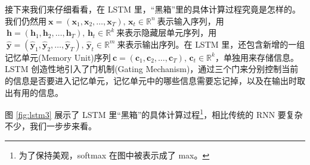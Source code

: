 \documentclass[12pt,a4paper]{article}
\begin{document}
接下来我们来仔细看看，在 {\crimson LSTM} 里，“黑箱”里的具体计算过程究竟是怎样的。我们仍然用$\:\bm{\mathbf{x}}=(\bm{x}_1,\bm{x}_2,\ldots,\bm{x}_T),\, \bm{x}_t \in \mathbb{R}^n\:$表示输入序列，用$\:\bm{\mathbf{h}}=(\bm{h}_1,\bm{h}_2,\ldots,\bm{h}_T),\, \bm{h}_t \in \mathbb{R}^k\:$来表示隐藏层单元序列，用$\:\hat{\bm{\mathbf{y}}}=(\hat{\bm{y}}_1,\hat{\bm{y}}_2,\ldots,\hat{\bm{y}}_T),\, \hat{\bm{y}}_t \in \mathbb{R}^m\:$来表示输出序列。在 {\crimson LSTM} 里，还包含新增的一组{\hei 记忆单元}({\crimson Memory Unit})序列$\:\bm{\mathbf{c}}=(\bm{c}_1,\bm{c}_2,\ldots,\bm{c}_T),\, \bm{c}_t \in \mathbb{R}^k$，单独用来存储信息。{\crimson LSTM} 创造性地引入了{\hei 门机制}({\crimson Gating Mechanism})，通过三个门来分别控制当前的信息是否要进入记忆单元，记忆单元中的哪些信息需要忘记掉，以及在输出时取出有用的信息。

图 {\kai \ref{fig:lstm3}} 展示了 {\crimson LSTM} 里“黑箱”的具体计算过程\footnote{\hei 为了保持美观，{\crimson softmax} 在图中被表示成了 {\crimson max}。}，相比传统的 {\crimson RNN} 要复杂不少，我们一步步来看。
\end{document}
